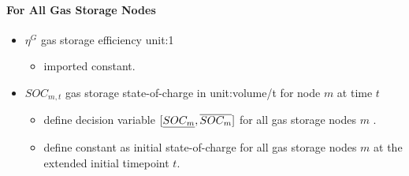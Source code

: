 \paragraph{For All Gas Storage Nodes}
\begin{itemize}

\item $\eta^G$ gas storage efficiency \gls{unit:1}
  \begin{itemize}
  \item \gls{imported} constant.
  \end{itemize}

\item $SOC_{m,t}$ gas storage state-of-charge in \gls{unit:volume/t}
for node $m$ at time $t$ \begin{itemize} \item \gls{define} decision variable
  $[\underline{SOC_m}, \overline{SOC_m}]$ for all gas storage nodes
  $m$ \atallt{}.  \item \gls{define} constant as initial state-of-charge for all
  gas storage nodes $m$ at the extended initial timepoint $t$.  \end{itemize}

\end{itemize}
